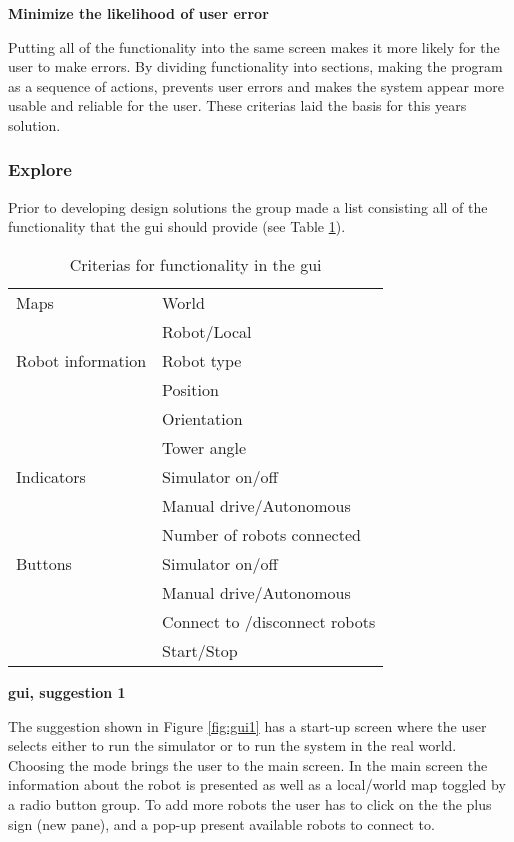\textbf{Minimize the likelihood of user error}

Putting all of the functionality into the same screen makes it more likely for the user to make errors. By dividing functionality into sections, making the program as a sequence of actions, prevents user errors and makes the system appear more usable and reliable for the user. These criterias laid the basis for this years solution. 

\subsubsection{Explore}
Prior to developing design solutions the group made a list consisting all of the functionality that the \acrshort{gui} should provide (see Table \ref{tab:guicriterias}).
\begin{table}[h]
\begin{center}
 \begin{tabular}{|l l|} 
 \hline
 Maps               &   World \\
                    &   Robot/Local \\
 \hline
 Robot information  &   Robot type \\
                    &   Position \\
                    &   Orientation \\
                    &   Tower angle \\
 \hline
 Indicators         &   Simulator on/off \\
                    &   Manual drive/Autonomous \\
                    &   Number of robots connected \\
 \hline
 Buttons            &   Simulator on/off \\
                    &   Manual drive/Autonomous \\
                    &   Connect to /disconnect robots \\
                    &   Start/Stop \\

\hline
\end{tabular}
\end{center}
\caption{Criterias for functionality in the \acrshort{gui}}
\label{tab:guicriterias}
\end{table}

\textbf{\acrlong{gui}, suggestion 1}

The suggestion shown in Figure \ref{fig:gui1} has a start-up screen where the user selects either to run the simulator or to run the system in the real world. Choosing the mode brings the user to the main screen. In the main screen the information about the robot is presented as well as a local/world map toggled by a radio button group. To add more robots the user has to click on the the plus sign (new pane), and a pop-up present available robots to connect to.

